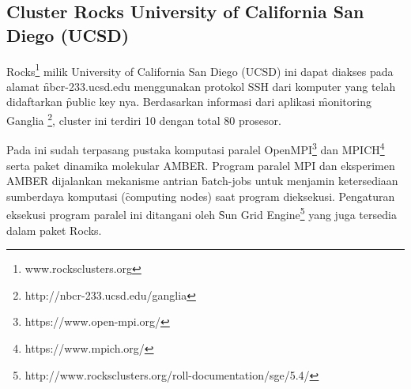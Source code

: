 \subsection{Cluster Rocks University of California San Diego (UCSD)}
\Cluster Rocks\footnote{www.rocksclusters.org} milik University of California San Diego (UCSD) ini dapat diakses pada alamat \f{nbcr-233.ucsd.edu} menggunakan protokol SSH dari komputer yang telah didaftarkan \f{public key} nya. Berdasarkan informasi dari aplikasi \f{monitoring} Ganglia \footnote{http://nbcr-233.ucsd.edu/ganglia}, cluster ini terdiri 10 \nodes dengan total 80 prosesor. 

Pada \cluster ini sudah terpasang pustaka komputasi paralel OpenMPI\footnote{https://www.open-mpi.org/} dan MPICH\footnote{https://www.mpich.org/} serta paket dinamika molekular AMBER. Program paralel MPI dan eksperimen AMBER dijalankan mekanisme antrian \f{batch-jobs} untuk menjamin ketersediaan sumberdaya komputasi (\f{computing nodes}) saat program dieksekusi. Pengaturan eksekusi program paralel ini ditangani oleh \f{Sun Grid Engine}\footnote{http://www.rocksclusters.org/roll-documentation/sge/5.4/} yang juga tersedia dalam paket Rocks.
